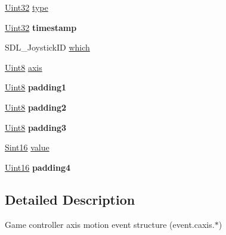 \begin{DoxyCompactItemize}
\item 
\hyperlink{_s_d_l__stdinc_8h_add440eff171ea5f55cb00c4a9ab8672d}{Uint32} \hyperlink{struct_s_d_l___controller_axis_event_aa904b61e4763d28d887cf8afcc3cbb7c}{type}
\item 
\mbox{\label{struct_s_d_l___controller_axis_event_afc92dba0b4d1652a1ecf9e85606d1f14}} 
\hyperlink{_s_d_l__stdinc_8h_add440eff171ea5f55cb00c4a9ab8672d}{Uint32} {\bfseries timestamp}
\item 
S\+D\+L\+\_\+\+Joystick\+ID \hyperlink{struct_s_d_l___controller_axis_event_a07087f68ea9d64b50047d65312ee7b94}{which}
\item 
\hyperlink{_s_d_l__stdinc_8h_a2944638813a090aa23e62f4da842c3e2}{Uint8} \hyperlink{struct_s_d_l___controller_axis_event_aba6543c143521aebce06a41a8cf79db0}{axis}
\item 
\mbox{\label{struct_s_d_l___controller_axis_event_af980495b1e24f9a868f2ccb25ce9629b}} 
\hyperlink{_s_d_l__stdinc_8h_a2944638813a090aa23e62f4da842c3e2}{Uint8} {\bfseries padding1}
\item 
\mbox{\label{struct_s_d_l___controller_axis_event_a4a04fcd20a54db21c5258ab0e40c6ab5}} 
\hyperlink{_s_d_l__stdinc_8h_a2944638813a090aa23e62f4da842c3e2}{Uint8} {\bfseries padding2}
\item 
\mbox{\label{struct_s_d_l___controller_axis_event_ab82598fe5621dca9b1a41f7b2ca1e9a0}} 
\hyperlink{_s_d_l__stdinc_8h_a2944638813a090aa23e62f4da842c3e2}{Uint8} {\bfseries padding3}
\item 
\hyperlink{_s_d_l__stdinc_8h_a9d0257032c0e146ab6121bf0122712f5}{Sint16} \hyperlink{struct_s_d_l___controller_axis_event_a1ed7f14255ed01b982d40a38791d475a}{value}
\item 
\mbox{\label{struct_s_d_l___controller_axis_event_ae0ad0f279b9978bbbac9f5b22ae8020b}} 
\hyperlink{_s_d_l__stdinc_8h_a31fcc0a076c9068668173ee26d33e42b}{Uint16} {\bfseries padding4}
\end{DoxyCompactItemize}


\subsection{Detailed Description}
Game controller axis motion event structure (event.\+caxis.$\ast$) 

